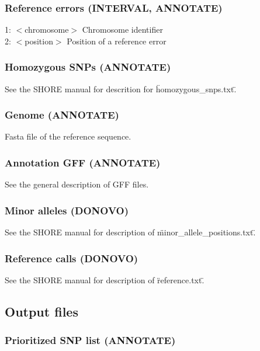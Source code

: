 \documentclass[a4paper,10pt]{scrartcl}
\begin{document}
\subsubsection{Reference errors (INTERVAL, ANNOTATE)}

1: $<$chromosome$>$ Chromosome identifier\\
2: $<$position$>$ Position of a reference error\\

\subsubsection{Homozygous SNPs (ANNOTATE)}

See the SHORE manual for descrition for \"homozygous\_snps.txt\".

\subsubsection{Genome (ANNOTATE)}

Fasta file of the reference sequence.

\subsubsection{Annotation GFF (ANNOTATE)}

See the general description of GFF files.

\subsubsection{Minor alleles (DONOVO)}

See the SHORE manual for description of \"minor\_allele\_positions.txt\".

\subsubsection{Reference calls (DONOVO)}

See the SHORE manual for description of \"reference.txt\".

\subsection{Output files}

\subsubsection{Prioritized SNP list (ANNOTATE)}
\end{document}
